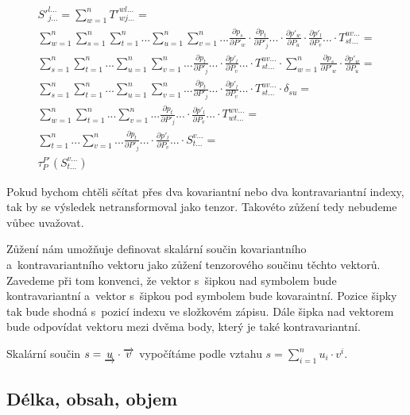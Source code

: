 \begin{equation}
\begin{split}
S'^{l...}_{j...} = \sum_{w=1}^n T'^{wl...}_{wj...} = \\
\sum_{w=1}^n \sum_{s=1}^n \sum_{t=1}^n ... \sum_{u=1}^n \sum_{v=1}^n ... \frac{\partial p_s}{\partial P'_w} \cdot \frac{\partial p_t}{\partial P'_j} ... \cdot \frac{\partial p'_w}{\partial P_u} \cdot \frac{\partial p'_l}{\partial P_v} ... \cdot T_{st...}^{uv...} = \\
\sum_{s=1}^n \sum_{t=1}^n ... \sum_{u=1}^n \sum_{v=1}^n ... \frac{\partial p_t}{\partial P'_j} ... \cdot \frac{\partial p'_l}{\partial P_v} ... \cdot T_{st...}^{uv...} \cdot \sum_{w=1}^n \frac{\partial p_s}{\partial P'_w} \cdot \frac{\partial p'_w}{\partial P_u} = \\
\sum_{s=1}^n \sum_{t=1}^n ... \sum_{u=1}^n \sum_{v=1}^n ... \frac{\partial p_t}{\partial P'_j} ... \cdot \frac{\partial p'_l}{\partial P_v} ... \cdot T_{st...}^{uv...} \cdot \delta_{su} = \\
\sum_{w=1}^n \sum_{t=1}^n ... \sum_{v=1}^n ... \frac{\partial p_t}{\partial P'_j} ... \cdot \frac{\partial p'_l}{\partial P_v} ... \cdot T_{wt...}^{wv...} = \\
\sum_{t=1}^n ... \sum_{v=1}^n ... \frac{\partial p_t}{\partial P'_j} ... \cdot \frac{\partial p'_l}{\partial P_v} ... \cdot S_{t...}^{v...} = \\
\tau_P^{P'} (S_{t...}^{v...})
\end{split}
\end{equation}

Pokud bychom chtěli sčítat přes dva kovariantní nebo dva kontravariantní indexy, tak by se výsledek netransformoval jako tenzor. Takovéto zůžení tedy nebudeme
vůbec uvažovat.

Zůžení nám umožňuje definovat skalární součin kovariantního a~kontravariantního vektoru jako zůžení tenzorového součinu těchto vektorů. Zavedeme při tom
konvenci, že vektor s~šipkou nad symbolem bude kontravariantní a~vektor s~šipkou pod symbolem bude kovaraintní. Pozice šipky tak bude shodná s~pozicí
indexu ve složkovém zápisu. Dále šipka nad vektorem bude odpovídat vektoru mezi dvěma body, který je také kontravariantní.

\begin{fact}
Skalární součin \(s = \underrightarrow{u} \cdot \overrightarrow{v}\) vypočítáme podle vztahu \(s = \sum_{i=1}^n u_i \cdot v^i\).
\end{fact}

\subsection{Délka, obsah, objem}

